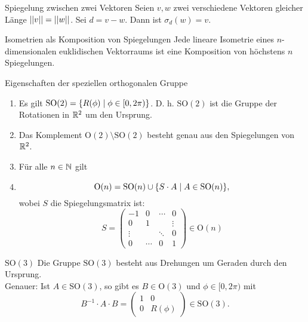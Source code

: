 \documentclass[main.tex]{subfiles}
\begin{document}
\begin{karte}{Spiegelung zwischen zwei Vektoren}
    Seien \(v,w\) zwei verschiedene Vektoren 
    gleicher Länge \( \left|\left|v\right|\right| = \left|\left|w\right|\right| \). Sei 
    \( d = v-w \). Dann ist \( \sigma_d(w) = v \).
\end{karte}

\begin{karte}{Isometrien als Komposition von Spiegelungen}
    Jede lineare Isometrie eines \(n\)-dimensionalen 
    euklidischen Vektorraums ist eine Komposition von 
    höchstens \(n\) Spiegelungen.
\end{karte}

\begin{karte}{Eigenschaften der speziellen orthogonalen Gruppe}
    \begin{enumerate}
        \item Es gilt \( \mathrm{SO}(2) = \{R(\phi) \;\vert\; 
        \phi \in [0,2\pi)\} \). D. h. \( \mathrm{SO}(2) \) ist 
        die Gruppe der Rotationen in \( \mathbb{R}^2 \) um den Ursprung.
        \item Das Komplement \( \mathrm{O}(2) \setminus 
        \mathrm{SO}(2) \) besteht genau aus den Spiegelungen 
        von \(\mathbb{R}^2\).
        \item Für alle \( n\in\mathbb{N} \) gilt 
        \item \[ \mathrm{O}(n) = \mathrm{SO}(n) \cup 
        \{S\cdot A \;\vert\; A \in \mathrm{SO}(n)\}, \] 
        wobei \(S\) die Spiegelungsmatrix ist: 
        \[ S = \begin{pmatrix}
            -1 & 0 &\cdots & 0 \\
            0 & 1 && \vdots \\
            \vdots && \ddots & 0 \\
            0 & \cdots & 0 & 1
        \end{pmatrix} \in \mathrm{O}(n) \]
    \end{enumerate}
\end{karte}

\begin{karte}{\( \mathrm{SO}(3) \)}
    Die Gruppe \( \mathrm{SO}(3) \) besteht aus 
    Drehungen um Geraden durch den Ursprung. \\
    Genauer: Ist \(A \in \mathrm{SO}(3)\), so gibt 
    es \( B\in \mathrm{O}(3) \) und 
    \( \phi \in [0,2\pi) \) mit 
    \[ B^{-1} \cdot A \cdot B = 
    \begin{pmatrix}
        1 & 0 \\ 0 & R(\phi)
    \end{pmatrix} \in \mathrm{SO}(3). \]
\end{karte}
\end{document}
